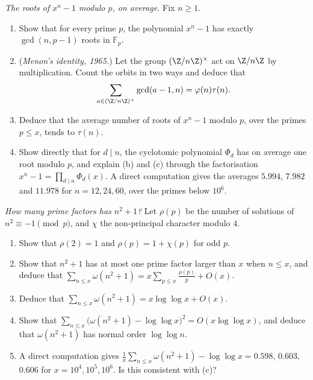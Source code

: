 \begin{exercise}[$\star\star$]\label{pb:menon}
\emph{The roots of $x^n-1$ modulo $p$, on average.} Fix $n\ge1$.
\begin{enumerate}[label=(\alph*)]
\item Show that for every prime $p$, the polynomial $x^n-1$ has exactly $\gcd(n,p-1)$ roots in $\mathbb F_p$.
\item (\emph{Menon's identity, 1965.}) Let the group $(\Z/n\Z)^\times$ act on $\Z/n\Z$ by multiplication. Count the orbits in two ways and deduce that
\[
\sum_{a\in(\Z/n\Z)^\times}\gcd(a-1,n)=\varphi(n)\tau(n).
\]
\item Deduce that the average number of roots of $x^n-1$ modulo $p$, over the primes $p\le x$, tends to $\tau(n)$.
\item Show directly that for $d\mid n$, the cyclotomic polynomial $\Phi_d$ has on average one root modulo $p$, and explain (b) and (c) through the factorisation
$x^n-1=\prod_{d\mid n}\Phi_d(x)$. A direct computation gives the averages $5.994$, $7.982$ and $11.978$ for $n=12,24,60$, over the primes below $10^6$.
\end{enumerate}
\end{exercise}

\begin{exercise}[$\star\star\star$]\label{pb:omegapoly}
\emph{How many prime factors has $n^2+1$?} Let $\rho(p)$ be the number of solutions of $n^2\equiv-1\pmod p$, and $\chi$ the non-principal character modulo $4$.
\begin{enumerate}[label=(\alph*)]
\item Show that $\rho(2)=1$ and $\rho(p)=1+\chi(p)$ for odd $p$.
\item Show that $n^2+1$ has at most one prime factor larger than $x$ when $n\le x$, and deduce that $\sum_{n\le x}\omega(n^2+1)=x\sum_{p\le x}\frac{\rho(p)}p+O(x)$.
\item Deduce that $\sum_{n\le x}\omega(n^2+1)=x\log\log x+O(x)$.
\item Show that $\sum_{n\le x}\bigl(\omega(n^2+1)-\log\log x\bigr)^2=O(x\log\log x)$, and deduce that $\omega(n^2+1)$ has normal order $\log\log n$.
\item A direct computation gives $\frac1x\sum_{n\le x}\omega(n^2+1)-\log\log x=0.598$, $0.603$, $0.606$ for $x=10^4,10^5,10^6$. Is this consistent with (c)?
\end{enumerate}
\end{exercise}

